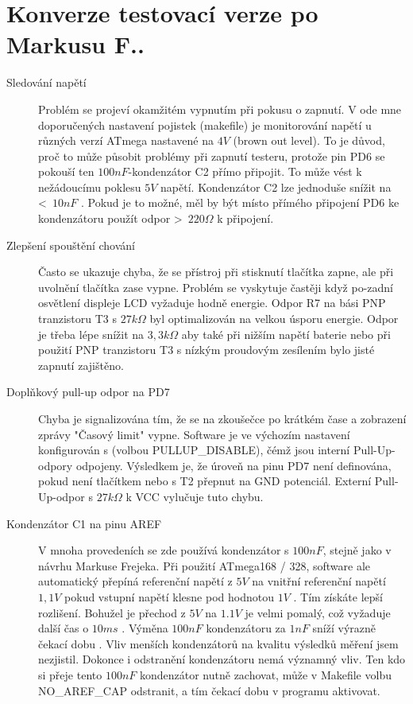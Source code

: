 \section{Konverze testovací verze po Markusu F..}
\label{sec:change_markus}

\begin{description}
\item[Sledování napětí]  
Problém se projeví okamžitém vypnutím při pokusu o zapnutí.
V ode mne doporučených nastavení pojistek (makefile) je monitorování napětí u
různých verzí ATmega nastavené na \(4V\)  (brown out level).  To je důvod, proč to může působit
problémy při zapnutí testeru, protože pin PD6 se pokouší ten \(100nF\)-kondenzátor C2 
přímo připojit. To může vést k nežádoucímu poklesu \(5V\)  napětí.
Kondenzátor C2 lze jednoduše snížit na \textless~\(10nF\) . Pokud je to možné, měl by být
místo přímého připojení PD6 ke kondenzátoru použít odpor \textgreater~\(220\Omega\) k připojení.

\item[Zlepšení spouštění chování]
Často se ukazuje chyba, že se přístroj při stisknutí tlačítka zapne, ale při uvolnění tlačítka
zase vypne. Problém se vyskytuje častěji když po-zadní osvětlení displeje LCD vyžaduje hodně energie.
Odpor R7 na bási PNP tranzistoru T3 s \(27k\Omega\)  byl optimalizován na velkou úsporu energie.
Odpor je třeba lépe snížit na \(3,3k\Omega\) aby také při nižším napětí baterie nebo při použití
PNP tranzistoru T3 s nízkým proudovým zesílením bylo jisté zapnutí zajištěno.

\item[Doplňkový pull-up odpor na PD7]
Chyba je signalizována tím, že se na zkoušečce po krátkém čase a zobrazení zprávy
"Časový limit" vypne. Software je ve výchozím nastavení konfigurován s (volbou PULLUP\_DISABLE),
čémž jsou interní Pull-Up-odpory odpojeny.
Výsledkem je, že úroveň na pinu PD7 není definována, pokud není tlačítkem nebo s T2 přepnut na GND potenciál.
Externí  Pull-Up-odpor s \(27k\Omega\) k VCC vylučuje tuto chybu.

\item[Kondenzátor C1 na pinu AREF]
V mnoha provedeních se zde používá kondenzátor s \(100nF\), stejně jako v návrhu Markuse Frejeka.
Při použití ATmega168 / 328, software ale automatický přepíná referenční napětí z  \(5V\) na vnitřní
referenční napětí \(1,1V\) pokud vstupní napětí klesne pod hodnotou \(1V\) .
Tím získáte lepší rozlišení.
Bohužel je přechod z \(5V\) na \(1.1V\) je velmi pomalý, což vyžaduje další čas o \(10ms\) .
Výměna  \(100nF\) kondenzátoru za \(1nF\) sníží výrazně čekací dobu  . Vliv menších kondenzátorů
na kvalitu výsledků měření jsem nezjistil. Dokonce i odstranění kondenzátoru nemá významný vliv.
Ten kdo si přeje tento \(100nF\) kondenzátor nutně zachovat, může v Makefile volbu NO\_AREF\_CAP odstranit,
 a tím čekací dobu v programu aktivovat.


\end{description}
